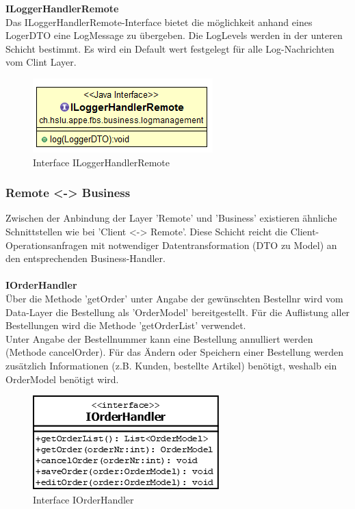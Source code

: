 \textbf{ILoggerHandlerRemote}\\
Das ILoggerHandlerRemote-Interface bietet die möglichkeit anhand eines LogerDTO eine LogMessage zu übergeben. Die LogLevels werden in der unteren Schicht bestimmt. Es wird ein Default wert festgelegt für alle Log-Nachrichten vom Clint Layer.
\begin{figure}[H]
	\includegraphics[width=0.5\linewidth]{Images/ILoggerHandlerRemonte}
	\caption{Interface ILoggerHandlerRemote}
	\label{fig:if-ILoggerHandlerRemote}
\end{figure}







\subsubsection{Remote <-> Business}
Zwischen der Anbindung der Layer 'Remote' und 'Business' existieren ähnliche Schnittstellen wie bei 'Client <-> Remote'. Diese Schicht reicht die Client-Operationsanfragen mit notwendiger Datentransformation (DTO zu Model) an den entsprechenden Business-Handler.\\\\


\textbf{IOrderHandler}\\
Über die Methode 'getOrder' unter Angabe der gewünschten Bestellnr wird vom Data-Layer die Bestellung als 'OrderModel' bereitgestellt. Für die Auflistung aller Bestellungen wird die Methode 'getOrderList' verwendet.\\
Unter Angabe der Bestellnummer kann eine Bestellung annulliert werden (Methode cancelOrder). Für das Ändern oder Speichern einer Bestellung werden zusätzlich Informationen (z.B. Kunden, bestellte Artikel) benötigt, weshalb ein OrderModel benötigt wird. 
\begin{figure}[H]
	\includegraphics[width=0.3\linewidth]{Images/IOrderHandler}
	\caption{Interface IOrderHandler}
	\label{fig:if-IOrderHandler}
\end{figure}




